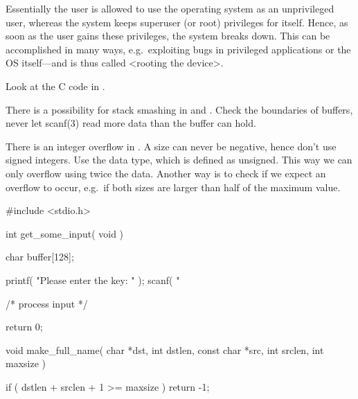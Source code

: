\documentclass[svv,addpoints]{miunexam}
\begin{document}
\begin{questions}
\begin{solution}
    Essentially the user is allowed to use the operating system as an 
    unprivileged user, whereas the system keeps superuser (or root) privileges 
    for itself.
    Hence, as soon as the user gains these privileges, the system breaks down.
    This can be accomplished in many ways, e.g.~exploiting bugs in privileged 
    applications or the OS itself---and is thus called <rooting the device>.
  \end{solution}


  \question\label{q:stacksmash:C}
  Look at the C code in .
  \begin{solution}
    There is a possibility for stack smashing in  and 
    .
    Check the boundaries of buffers, never let scanf(3) read more data than the 
    buffer can hold.

    There is an integer overflow in .
    A size can never be negative, hence don't use signed integers.
    Use the  data type, which is defined as unsigned.
    This way we can only overflow using twice the data.
    Another way is to check if we expect an overflow to occur, e.g.~if both 
    sizes are larger than half of the maximum value.
  \end{solution}

  \begin{src}[float,caption={Some vulnerable C code.},label={lst:overrun}]
#include <stdio.h>

int
get_some_input( void )
{
  char buffer[128];

  printf( "Please enter the key: " );
  scanf( "%

  /* process input */

  return 0;
}

void
make_full_name( char *dst, int dstlen,
                const char *src, int srclen,
                int maxsize )
{
  if ( dstlen + srclen + 1 >= maxsize )
    return -1;

}
\end{src}
\end{questions}
\end{document}
